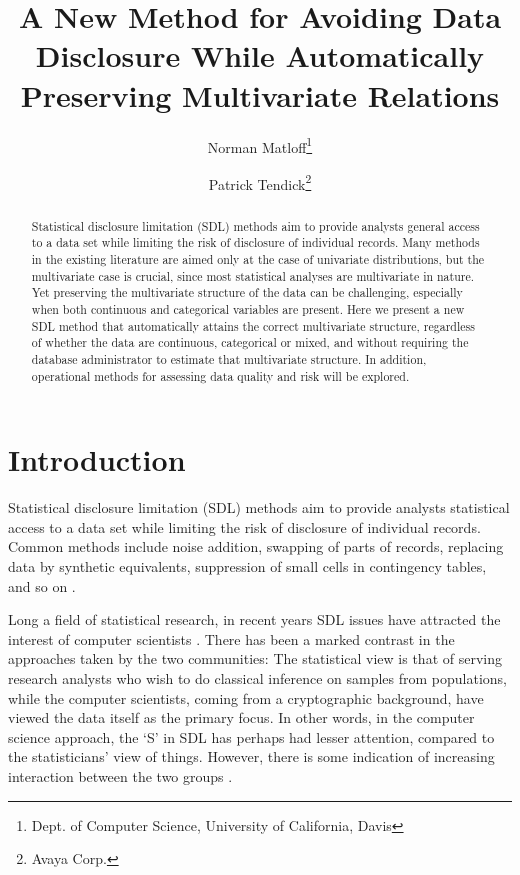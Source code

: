 \documentclass[11pt]{article}
\title{A New Method for Avoiding Data Disclosure While
Automatically Preserving Multivariate Relations}
\author{
Norman Matloff\thanks{Dept. of Computer Science, University of
California, Davis}
\and
Patrick Tendick\thanks{Avaya Corp.}
}
\begin{document}
\maketitle

\begin{abstract}

\noindent Statistical disclosure limitation (SDL) methods aim to provide
analysts general access to a data set while limiting the risk of
disclosure of individual records.  Many methods in the existing
literature are aimed only at the case of univariate distributions, but
the multivariate case is crucial, since most statistical analyses are
multivariate in nature.  Yet preserving the multivariate structure of
the data can be challenging, especially when both continuous and
categorical variables are present.  Here we present a new SDL method
that automatically attains the correct multivariate structure,
regardless of whether the data are continuous, categorical or mixed,
and without requiring the database administrator to estimate that
multivariate structure.  In addition, operational methods for assessing
data quality and risk will be explored.

\end{abstract}

\section{Introduction}

Statistical disclosure limitation (SDL) methods aim to provide analysts
statistical access to a data set while limiting the risk of disclosure of
individual records.  Common methods include noise addition, swapping of
parts of records, replacing data by synthetic equivalents, suppression
of small cells in contingency tables, and so on \cite{duncan}. 


Long a field of statistical research, in recent years SDL issues have
attracted the interest of computer scientists \cite{dwork}.  There has
been a marked contrast in the approaches taken by the two communities:
The statistical view is that of serving research analysts who wish to do
classical inference on samples from populations, while the computer
scientists, coming from a cryptographic background, have viewed the data
itself as the primary focus.  In other words, in the computer science
approach, the `S' in SDL has perhaps had lesser attention, compared to
the statisticians' view of things.  However, there is some indication of
increasing interaction between the two groups \cite{abowd}.
\end{document}
